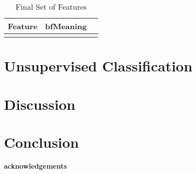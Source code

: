 \documentclass[12pt]{emulateapj}
\begin{document}
\begin{table*}[hbtp]
\renewcommand{\arraystretch}{1.3}
\footnotesize
\caption{Final Set of Features}
\begin{threeparttable} 
\begin{tabularx}{\textwidth}{p{2.0cm}p{10.0cm}X}%
\toprule
\bf{Feature} & bf{Meaning} 
 \\ \midrule

  \\\bottomrule
\end{tabularx}
   \begin{tablenotes}
      \item{}
\end{tablenotes}
\end{threeparttable}
\label{tab:priortable}
\end{table*}




\section{Unsupervised Classification}


\section{Discussion}


\section{Conclusion}

\paragraph{acknowledgements}



\end{document}
